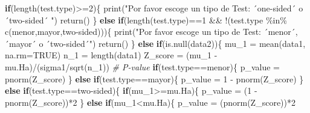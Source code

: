 \documentclass[]{article}
\newenvironment{Shaded}{\begin{snugshade}}{\end{snugshade}}
\newcommand{\AttributeTok}[1]{\textcolor[rgb]{0.77,0.63,0.00}{#1}}
\newcommand{\CommentTok}[1]{\textcolor[rgb]{0.56,0.35,0.01}{\textit{#1}}}
\newcommand{\ConstantTok}[1]{\textcolor[rgb]{0.00,0.00,0.00}{#1}}
\newcommand{\ControlFlowTok}[1]{\textcolor[rgb]{0.13,0.29,0.53}{\textbf{#1}}}
\newcommand{\DecValTok}[1]{\textcolor[rgb]{0.00,0.00,0.81}{#1}}
\newcommand{\FunctionTok}[1]{\textcolor[rgb]{0.00,0.00,0.00}{#1}}
\newcommand{\NormalTok}[1]{#1}
\newcommand{\OtherTok}[1]{\textcolor[rgb]{0.56,0.35,0.01}{#1}}
\newcommand{\SpecialCharTok}[1]{\textcolor[rgb]{0.00,0.00,0.00}{#1}}
\newcommand{\StringTok}[1]{\textcolor[rgb]{0.31,0.60,0.02}{#1}}
\begin{document}
\begin{Shaded}
\begin{Highlighting}[]
  \ControlFlowTok{if}\NormalTok{(}\FunctionTok{length}\NormalTok{(test.type)}\SpecialCharTok{\textgreater{}=}\DecValTok{2}\NormalTok{)\{}
    \FunctionTok{print}\NormalTok{(}\StringTok{"Por favor escoge un tipo de Test: ´one{-}sided´ o ´two{-}sided´ "}\NormalTok{)}
    \FunctionTok{return}\NormalTok{()}
\NormalTok{  \}}
  \ControlFlowTok{else} \ControlFlowTok{if}\NormalTok{(}\FunctionTok{length}\NormalTok{(test.type)}\SpecialCharTok{==}\DecValTok{1} \SpecialCharTok{\&\&} \SpecialCharTok{!}\NormalTok{(test.type }\SpecialCharTok{\%in\%} \FunctionTok{c}\NormalTok{(}\StringTok{\textquotesingle{}menor\textquotesingle{}}\NormalTok{,}\StringTok{\textquotesingle{}mayor\textquotesingle{}}\NormalTok{,}\StringTok{\textquotesingle{}two{-}sided\textquotesingle{}}\NormalTok{)))\{}
    \FunctionTok{print}\NormalTok{(}\StringTok{"Por favor escoge un tipo de Test: ´menor´, ´mayor´ o ´two{-}sided´"}\NormalTok{)}
    \FunctionTok{return}\NormalTok{()}
\NormalTok{  \}}
  \ControlFlowTok{else} \ControlFlowTok{if}\NormalTok{(}\FunctionTok{is.null}\NormalTok{(data2))\{}
\NormalTok{    mu\_1 }\OtherTok{=} \FunctionTok{mean}\NormalTok{(data1, }\AttributeTok{na.rm=}\ConstantTok{TRUE}\NormalTok{)}
\NormalTok{    n\_1 }\OtherTok{=} \FunctionTok{length}\NormalTok{(data1)}
\NormalTok{    Z\_score }\OtherTok{=}\NormalTok{ (mu\_1 }\SpecialCharTok{{-}}\NormalTok{ mu.Ha)}\SpecialCharTok{/}\NormalTok{(sigma1}\SpecialCharTok{/}\FunctionTok{sqrt}\NormalTok{(n\_1))}
    \CommentTok{\# P{-}value}
    \ControlFlowTok{if}\NormalTok{(test.type}\SpecialCharTok{==}\StringTok{\textquotesingle{}menor\textquotesingle{}}\NormalTok{)\{}
\NormalTok{      p\_value }\OtherTok{=} \FunctionTok{pnorm}\NormalTok{(Z\_score)}
\NormalTok{    \}}
    \ControlFlowTok{else} \ControlFlowTok{if}\NormalTok{(test.type}\SpecialCharTok{==}\StringTok{\textquotesingle{}mayor\textquotesingle{}}\NormalTok{)\{}
\NormalTok{      p\_value }\OtherTok{=} \DecValTok{1} \SpecialCharTok{{-}} \FunctionTok{pnorm}\NormalTok{(Z\_score)}
\NormalTok{    \}}
    \ControlFlowTok{else} \ControlFlowTok{if}\NormalTok{(test.type}\SpecialCharTok{==}\StringTok{\textquotesingle{}two{-}sided\textquotesingle{}}\NormalTok{)\{}
      \ControlFlowTok{if}\NormalTok{(mu\_1}\SpecialCharTok{\textgreater{}=}\NormalTok{mu.Ha)\{}
\NormalTok{        p\_value }\OtherTok{=}\NormalTok{ (}\DecValTok{1} \SpecialCharTok{{-}} \FunctionTok{pnorm}\NormalTok{(Z\_score))}\SpecialCharTok{*}\DecValTok{2}
\NormalTok{      \}}
      \ControlFlowTok{else} \ControlFlowTok{if}\NormalTok{(mu\_1}\SpecialCharTok{\textless{}}\NormalTok{mu.Ha)\{}
\NormalTok{        p\_value }\OtherTok{=}\NormalTok{ (}\FunctionTok{pnorm}\NormalTok{(Z\_score))}\SpecialCharTok{*}\DecValTok{2}

\end{Highlighting}
\end{Shaded}
\end{document}
